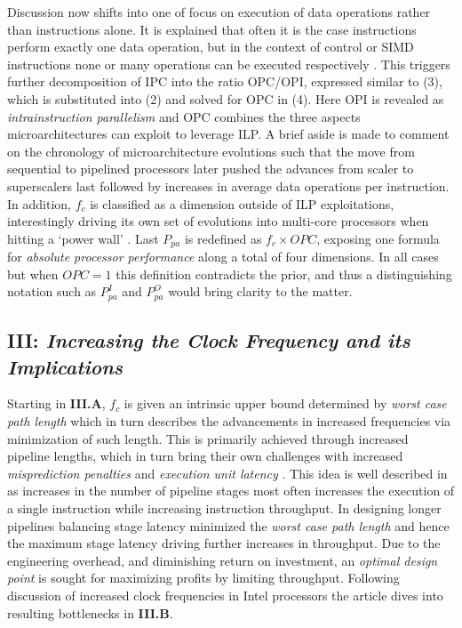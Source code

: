 \documentclass{article}
\begin{document}
Discussion now shifts into one of focus on execution of data operations rather than instructions alone. 
It is explained that often it is the case instructions perform exactly one data operation, but in the context of control or SIMD instructions none or many operations can be executed respectively \cite{Sima}.
This triggers further decomposition of IPC into the ratio OPC/OPI, expressed similar to (3), which is substituted into (2) and solved for OPC in (4). 
Here OPI is revealed as \emph{intrainstruction parallelism} and OPC combines the three aspects microarchitectures can exploit to leverage ILP. 
A brief aside is made to comment on the chronology of microarchitecture evolutions such that the move from sequential to pipelined processors later pushed the advances from scaler to superscalers last followed by increases in average data operations per instruction.
In addition, $f_{c}$ is classified as a dimension outside of ILP exploitations, interestingly driving its own set of evolutions into multi-core processors when hitting a `power wall' \cite{Bryant}.
Last $P_{pa}$ is redefined as $f_{c} \times OPC$, exposing one formula for \emph{absolute processor performance} along a total of four dimensions. 
In all cases but when $OPC = 1$ this definition contradicts the prior, and thus a distinguishing notation such as $P_{pa}^{I}$ and $P_{pa}^{O}$ would bring clarity to the matter. 

\subsection{\textbf{III}: \emph{Increasing the Clock Frequency and its Implications}}
Starting in \textbf{III.A}, $f_{c}$ is given an intrinsic upper bound determined by \emph{worst case path length} which in turn describes the advancements in increased frequencies via minimization of such length. 
This is primarily achieved through increased pipeline lengths, which in turn bring their own challenges with increased \emph{misprediction penalties} and \emph{execution unit latency} \cite{Sima}. 
This idea is well described in \cite{Hennessy} as increases in the number of pipeline stages most often increases the execution of a single instruction while increasing instruction throughput. In designing longer pipelines balancing stage latency minimized the \emph{worst case path length} and hence the maximum stage latency driving further increases in throughput. 
Due to the engineering overhead, and diminishing return on investment, an \emph{optimal design point} is sought for maximizing profits by limiting throughput. 
Following discussion of increased clock frequencies in Intel processors the article dives into resulting bottlenecks in \textbf{III.B}.
\end{document}
